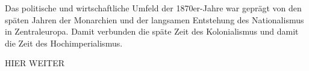 Das politische und wirtschaftliche Umfeld der 1870er-Jahre war geprägt von den späten Jahren der Monarchien und der langsamen Entstehung des Nationalismus in Zentraleuropa. Damit verbunden die späte Zeit des Kolonialismus und damit die Zeit des Hochimperialismus. 

HIER WEITER



